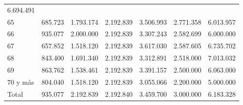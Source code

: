 \begin{tabular}{lllllll}
  \multicolumn{1}{r}{6.694.491} \\
\multicolumn{1}{l}{\hspace{1em}65} &
  \multicolumn{1}{|r}{685.723} &
  \multicolumn{1}{r}{1.793.174} &
  \multicolumn{1}{r}{2.192.839} &
  \multicolumn{1}{r}{3.506.993} &
  \multicolumn{1}{r}{2.771.358} &
  \multicolumn{1}{r}{6.013.957} \\
\multicolumn{1}{l}{\hspace{1em}66} &
  \multicolumn{1}{|r}{935.077} &
  \multicolumn{1}{r}{2.000.000} &
  \multicolumn{1}{r}{2.192.839} &
  \multicolumn{1}{r}{3.307.243} &
  \multicolumn{1}{r}{2.582.699} &
  \multicolumn{1}{r}{6.000.000} \\
\multicolumn{1}{l}{\hspace{1em}67} &
  \multicolumn{1}{|r}{657.852} &
  \multicolumn{1}{r}{1.518.120} &
  \multicolumn{1}{r}{2.192.839} &
  \multicolumn{1}{r}{3.617.030} &
  \multicolumn{1}{r}{2.587.605} &
  \multicolumn{1}{r}{6.735.702} \\
\multicolumn{1}{l}{\hspace{1em}68} &
  \multicolumn{1}{|r}{843.400} &
  \multicolumn{1}{r}{1.691.340} &
  \multicolumn{1}{r}{2.192.839} &
  \multicolumn{1}{r}{3.312.891} &
  \multicolumn{1}{r}{2.518.000} &
  \multicolumn{1}{r}{7.013.032} \\
\multicolumn{1}{l}{\hspace{1em}69} &
  \multicolumn{1}{|r}{863.762} &
  \multicolumn{1}{r}{1.538.461} &
  \multicolumn{1}{r}{2.192.839} &
  \multicolumn{1}{r}{3.391.157} &
  \multicolumn{1}{r}{2.500.000} &
  \multicolumn{1}{r}{6.063.000} \\
\multicolumn{1}{l}{\hspace{1em}70 y más} &
  \multicolumn{1}{|r}{804.040} &
  \multicolumn{1}{r}{1.518.120} &
  \multicolumn{1}{r}{2.192.839} &
  \multicolumn{1}{r}{3.055.066} &
  \multicolumn{1}{r}{2.200.000} &
  \multicolumn{1}{r}{5.000.000} \\
\multicolumn{1}{l}{\hspace{1em}Total} &
  \multicolumn{1}{|r}{935.077} &
  \multicolumn{1}{r}{2.192.839} &
  \multicolumn{1}{r}{2.192.840} &
  \multicolumn{1}{r}{3.459.700} &
  \multicolumn{1}{r}{3.000.000} &
  \multicolumn{1}{r}{6.183.328} \\
\cline{1-7}
\end{tabular}
